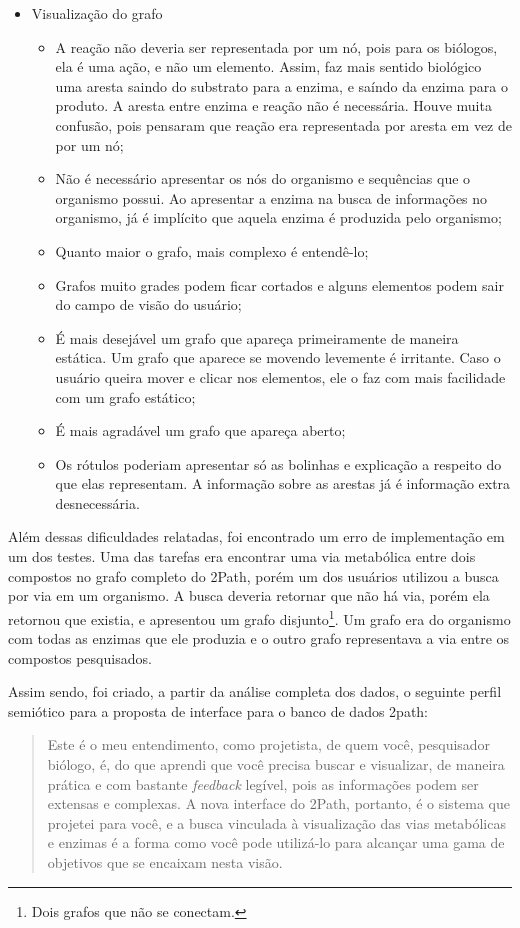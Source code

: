 \begin{itemize}
\item Visualização do grafo
  \begin{itemize}
  \item[1] A reação não deveria ser representada por um nó, pois para os biólogos, ela é uma ação, e não um elemento. Assim, faz mais sentido biológico uma aresta saindo do substrato para a enzima, e saíndo da enzima para o produto. A aresta entre enzima e reação não é necessária. Houve muita confusão, pois pensaram que reação era representada por aresta em vez de por um nó;
  \item[2] Não é necessário apresentar os nós do organismo e sequências que o organismo possui. Ao apresentar a enzima na busca de informações no organismo, já é implícito que aquela enzima é produzida pelo organismo;
  \item[3] Quanto maior o grafo, mais complexo é entendê-lo;
  \item[4] Grafos muito grades podem ficar cortados e alguns elementos podem sair do campo de visão do usuário;
  \item[5] É mais desejável um grafo que apareça primeiramente de maneira estática. Um grafo que aparece se movendo levemente é irritante. Caso o usuário queira mover e clicar nos elementos, ele o faz com mais facilidade com um grafo estático;
  \item[6] É mais agradável um grafo que apareça aberto;
  \item[7] Os rótulos poderiam apresentar só as bolinhas e explicação a respeito do que elas representam. A informação sobre as arestas já é informação extra desnecessária.
  \end{itemize}
\end{itemize}


\indent Além dessas dificuldades relatadas, foi encontrado um erro de implementação em um dos testes. Uma das tarefas era encontrar uma via metabólica entre dois compostos no grafo completo do 2Path, porém um dos usuários utilizou a busca por via em um organismo. A busca deveria retornar que não há via, porém ela retornou que existia, e apresentou um grafo disjunto\footnote{Dois grafos que não se conectam.}. Um grafo era do organismo com todas as enzimas que ele produzia e o outro grafo representava a via entre os compostos pesquisados.

\indent Assim sendo, foi criado, a partir da análise completa dos dados, o seguinte perfil semiótico para a proposta de interface para o banco de dados 2path:

\begin{quote}
	Este é o meu entendimento, como projetista, de quem você, pesquisador biólogo, é, do que aprendi que você precisa buscar e visualizar, de maneira prática e com bastante \textit{feedback} legível, pois as informações podem ser extensas e complexas. A nova interface do 2Path, portanto, é o sistema que projetei para você, e a busca vinculada à visualização das vias metabólicas e enzimas é a forma como você pode utilizá-lo para alcançar uma gama de objetivos que se encaixam nesta visão.
\end{quote}

